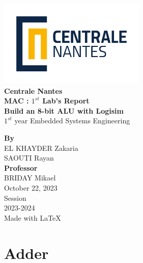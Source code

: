 \documentclass{article}
\begin{document}
\makeatletter
\begin{titlepage}
\begin{center}
    
\includegraphics[width=7cm]{assets/LogoCN_Q.png}
\\
\textbf{\large{Centrale Nantes}}
\\[2cm]

\textbf{\large{MAC : $1^{st}$ Lab's Report \\
Build an 8-bit ALU with Logisim}}
\\[14pt]
$1^{st}$ year Embedded Systems Engineering
\\[2cm]


\vfill

\textbf{By} \\
EL KHAYDER Zakaria \\
SAOUTI Rayan
\\[1cm]

\textbf{Professor} \\
BRIDAY Mikael
\\[3cm]


October 22, 2023 \\ [12pt]

Session \\
2023-2024 \\[12pt]
\small{Made with \LaTeX}
\end{center}
\end{titlepage}
\makeatother

\pagebreak

\setcounter{page}{1}

\clearpage
{}
\tableofcontents

\clearpage
{}
\listoffigures
{}
\listoftables

\clearpage

\setcounter{page}{1}

\section{Adder}
\end{document}
